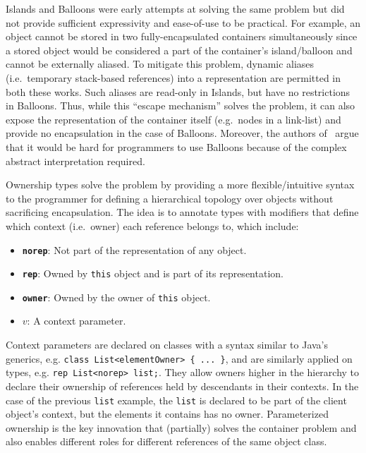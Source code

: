 \documentclass{acm_proc_article-sp}
\begin{document}
Islands and Balloons were early attempts at solving the same problem but did
not provide sufficient expressivity and ease-of-use to be practical. For
example, an object cannot be stored in two fully-encapsulated containers
simultaneously since a stored object would be considered a part of the
container's island/balloon and cannot be externally aliased. To mitigate this
problem, dynamic aliases (i.e.\ temporary stack-based references) into a
representation are permitted in both these works. Such aliases are read-only in
Islands, but have no restrictions in Balloons. Thus, while this ``escape
mechanism'' solves the problem, it can also expose the representation of the
container itself (e.g.\ nodes in a link-list) and provide no encapsulation in
the case of Balloons. Moreover, the authors of~\cite{noble98alias} argue that
it would be hard for programmers to use Balloons because of the complex
abstract interpretation required.

Ownership types solve the problem by providing a more flexible/intuitive syntax
to the programmer for defining a hierarchical topology over objects without
sacrificing encapsulation. The idea is to annotate types with modifiers
that define which context (i.e.\ owner) each reference belongs to, which
include: \vspace{-0.5ex}
\begin{itemize}
	\setlength\itemsep{-0.2ex}
	\item \textbf{\lstinline|norep|}:
		Not part of the representation of any object.
	\item \textbf{\lstinline|rep|}:
		Owned by \lstinline|this| object and is part of its representation.
	\item \textbf{\lstinline|owner|}:
		Owned by the owner of \lstinline|this| object.
	\item \textbf{$v$}:
		A context parameter.
\end{itemize} \vspace{-0.5ex}

Context parameters are declared on classes with a syntax similar to Java's
generics, e.g. \lstinline|class List<elementOwner> { ... }|, and are similarly
applied on types, e.g. \lstinline|rep List<norep> list;|. They allow owners
higher in the hierarchy to declare their ownership of references held by
descendants in their contexts. In the case of the previous \lstinline|list|
example, the \lstinline|list| is declared to be part of the client object's
context, but the elements it contains has no owner. Parameterized ownership is
the key innovation that (partially) solves the container problem and also
enables different roles for different references of the same object class.
\end{document}
